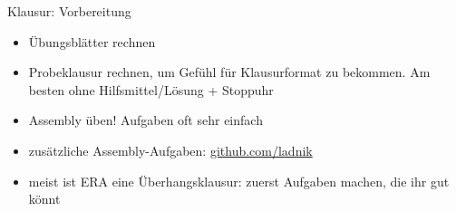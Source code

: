 \begin{frame}[c]{Klausur: Vorbereitung}{}
	\begin{itemize}
		\item Übungsblätter rechnen
		\item Probeklausur rechnen, um Gefühl für Klausurformat zu bekommen. Am besten ohne Hilfsmittel/Lösung + Stoppuhr
		\item Assembly üben! Aufgaben oft sehr einfach
		\item zusätzliche Assembly-Aufgaben: \href{https://github.com/ladnik/RISC-V-Assembly-Introductory-Exercises}{github.com/ladnik}
		\item meist ist ERA eine Überhangsklausur: zuerst Aufgaben machen, die ihr gut könnt
	\end{itemize}
\end{frame}


